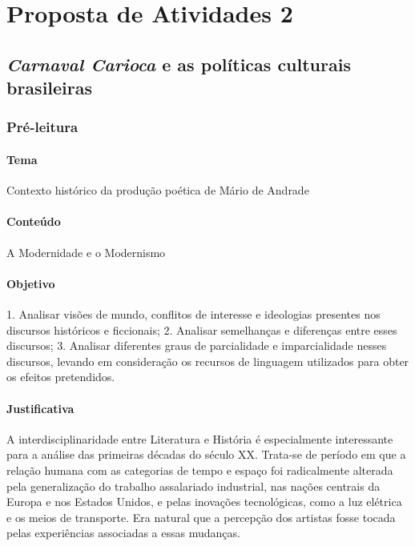 \documentclass[11pt]{extarticle}
\begin{document}
\section{Proposta de Atividades 2}

\subsection{\emph{Carnaval Carioca} e as políticas culturais brasileiras}

\subsubsection{Pré-leitura}

\paragraph{Tema} Contexto histórico da produção poética de Mário de
Andrade

\paragraph{Conteúdo} A Modernidade e o Modernismo

\paragraph{Objetivo} 1. Analisar visões de mundo, conflitos de interesse e
ideologias presentes nos discursos históricos e ficcionais; 2. Analisar
semelhanças e diferenças entre esses discursos; 3. Analisar diferentes
graus de parcialidade e imparcialidade nesses discursos, levando em
consideração os recursos de linguagem utilizados para obter os efeitos
pretendidos.

\paragraph{Justificativa} A interdisciplinaridade entre Literatura e
História é especialmente interessante para a análise das primeiras
décadas do século XX. Trata-se de período em que a relação humana com as
categorias de tempo e espaço foi radicalmente alterada pela
generalização do trabalho assalariado industrial, nas nações centrais da
Europa e nos Estados Unidos, e pelas inovações tecnológicas, como a luz
elétrica e os meios de transporte. Era natural que a percepção dos
artistas fosse tocada pelas experiências associadas a essas mudanças.
\end{document}
